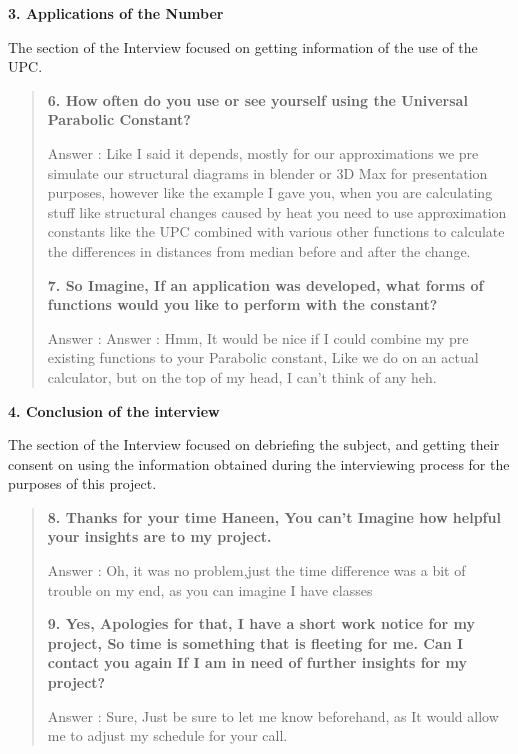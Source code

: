 \begin{enumerate}
\begin{flushleft}
    \textbf{3. Applications of the Number}

    The section of the Interview focused on getting information of the use of the UPC. \hfill \break

     \begin {quote}
    \textbf{6. How often do you use or see yourself using the Universal Parabolic Constant?}
    
    Answer : Like I said it depends, mostly for our approximations we pre simulate our structural diagrams in blender or 3D Max for presentation purposes, however like the example I gave you, when you are calculating stuff like structural changes caused by heat you need to use approximation constants like the UPC combined with various other functions to calculate the differences in distances from median before and after the change. \hfill \break
   \linebreak
   
    \textbf{7. So Imagine, If an application was developed, what forms of functions would you like to perform with the constant?}
    
    Answer : Answer : Hmm, It would be nice if I could combine my pre existing functions to your Parabolic constant, Like we do on an actual calculator, but on the top of my head, I can't think of any heh. \hfill \break
     \end {quote}
    \textbf{4. Conclusion of the interview }

   The section of the Interview focused on debriefing the subject, and getting their consent on using the information obtained during the interviewing process for the purposes of this project. \hfill \break

    \begin {quote}
    \textbf{8. Thanks for your time Haneen, You can't Imagine how helpful your insights are to my project.}
    
    Answer : Oh, it was no problem,just the time difference was a bit of trouble on my end, as you can imagine I have classes \hfill \break
   \linebreak
   
    \textbf{9. Yes, Apologies for that, I have a short work notice for my project, So time is something that is fleeting for me. Can I contact you again If I am in need of further insights for my project? }
    
    Answer : Sure, Just be sure to let me know beforehand, as It would allow me to adjust my schedule for your call.\hfill \break
    \end {quote}\hfill\break
    

\end{flushleft}
\end{enumerate}
